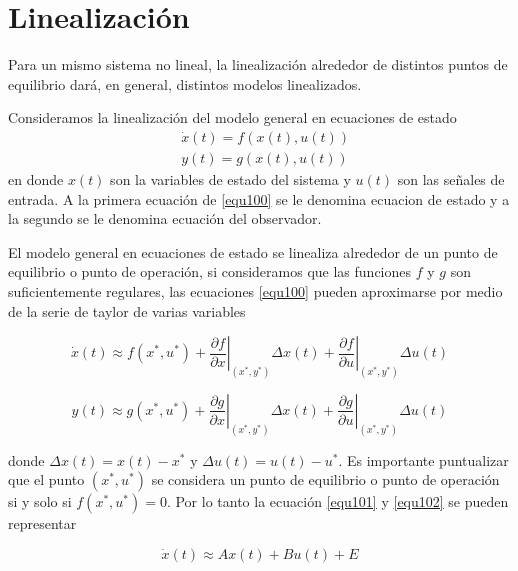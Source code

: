 \documentclass[12pt]{book}
\theoremstyle{definition}
\theoremstyle{remark}
\theoremstyle{plain}
\begin{document}
\section{Linealización}

Para un mismo sistema no lineal, la linealización alrededor de distintos puntos de equilibrio dará, en general, distintos modelos linealizados.

Consideramos la linealización del modelo general en ecuaciones de estado
\begin{equation}
\label{equ100}
\begin{aligned}
& \dot{x}(t) = f (x(t), u(t)) \\
& y(t) = g( x(t), u(t) )
\end{aligned}
\end{equation}
en donde $x(t)$ son la variables de estado del sistema y $u(t)$ son las señales de entrada. A la primera ecuación de \ref{equ100} se le denomina ecuacion de estado y a la segundo se le denomina ecuación del observador.

El modelo general en ecuaciones de estado se linealiza alrededor de un punto de equilibrio o punto de operación, si consideramos que las funciones $f$ y $g$ son suficientemente regulares, las ecuaciones \ref{equ100} pueden aproximarse por medio de la serie de taylor de varias variables

\begin{equation}
\label{equ101}
\dot{x}(t) \approx f(x^*,u^*)+ \left . \frac{\partial f}{\partial x}  \right | _ {(x^*, y^*)}\Delta x(t) + \left . \frac{\partial f}{\partial u}  \right |   _ {(x^*, y^*)} \Delta u(t)
\end{equation}

\begin{equation}
\label{equ102}
y(t) \approx g(x^*,u^*)+ \left . \frac{\partial g}{\partial x}  \right | _ {(x^*, y^*)}\Delta x(t) + \left . \frac{\partial g}{\partial u}  \right |   _ {(x^*, y^*)} \Delta u(t)
\end{equation}

donde  $\Delta x(t) = x(t)- x^*$ y $\Delta u (t) = u(t) - u^*$. Es importante puntualizar que el punto $(x^*, u^*)$ se considera un punto de equilibrio o punto de operación si y solo si $f(x^*, u^*) =0$. Por lo tanto la ecuación \ref{equ101} y \ref{equ102} se pueden representar

\begin{equation}
\label{equ103}
\dot{x}(t) \approx  A  x(t) +  B u(t)+ E
\end{equation}
\end{document}
